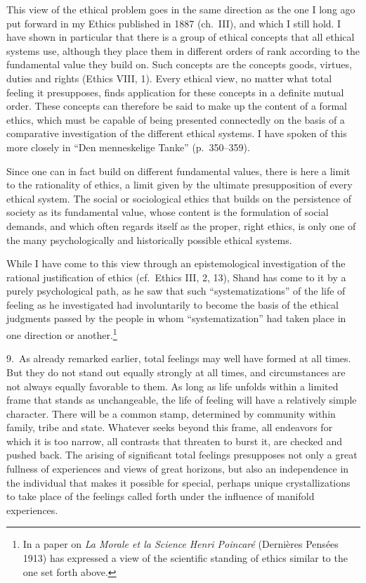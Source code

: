 \documentclass[12pt]{book}
\newcommand{\opage}[1]{\marginnote{\footnotesize\textit{[#1]}}}
\begin{document}
This view of the ethical problem goes in the same direction as the one I long ago
put forward in my Ethics published in 1887 (ch.~III), and which I still hold. I
have shown in particular that there is a group of ethical concepts that all
ethical systems use, although they place them in different orders of rank
according to the fundamental value they build on. Such concepts are the concepts
goods, virtues, duties and rights (Ethics VIII, 1). Every ethical view, no matter
what total feeling it presupposes, finds application for these concepts in a
definite mutual order. These concepts can therefore be said to make up the
content of a formal ethics, which must be capable of being presented connectedly
on the basis of a comparative investigation of the different ethical systems. I
have spoken of this more closely in ``Den menneskelige Tanke'' (p.~350--359).

Since one can in fact build on different fundamental values, there is here a
limit to the rationality of ethics, a limit given by the ultimate presupposition
of every ethical system. The social or \opage{37}sociological ethics that builds
on the persistence of society as its fundamental value, whose content is the
formulation of social demands, and which often regards itself as the proper,
right ethics, is only one of the many psychologically and historically possible
ethical systems.

While I have come to this view through an epistemological investigation of the
rational justification of ethics (cf.\ Ethics III, 2, 13), Shand has come to it by
a purely psychological path, as he saw that such ``systematizations'' of the life
of feeling as he investigated had involuntarily to become the basis of the
ethical judgments passed by the people in whom ``systematization'' had taken
place in one direction or another.\footnote{In a paper on \textit{La Morale et la
Science} \textit{Henri Poincaré} (Dernières Pensées 1913) has expressed a view of
the scientific standing of ethics similar to the one set forth above.} %

9.~As already remarked earlier, total feelings may well have formed at all
times. But they do not stand out equally strongly at all times, and circumstances
are not always equally favorable to them. As long as life unfolds within a
limited frame that stands as unchangeable, the life of feeling will have a
relatively simple character. There will be a common stamp, determined by
community within family, tribe and state. Whatever seeks beyond this frame, all
endeavors for which it is too narrow, all contrasts that threaten to burst it, are
checked and pushed back. The arising of significant total feelings presupposes
not only a great fullness of experiences and views of great horizons, but also an
independence in the individual that makes it possible for special, perhaps
unique crystallizations to take place of the feelings called forth under the
influence of manifold experiences.
\end{document}

